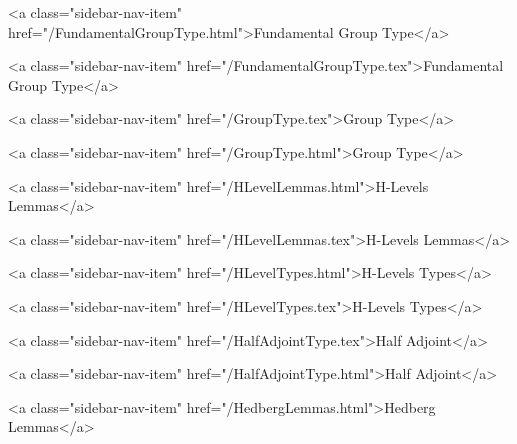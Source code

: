       
        
          <a class="sidebar-nav-item" href="/FundamentalGroupType.html">Fundamental Group Type</a>
        
      
    
      
        
          <a class="sidebar-nav-item" href="/FundamentalGroupType.tex">Fundamental Group Type</a>
        
      
    
      
        
          <a class="sidebar-nav-item" href="/GroupType.tex">Group Type</a>
        
      
    
      
        
          <a class="sidebar-nav-item" href="/GroupType.html">Group Type</a>
        
      
    
      
        
          <a class="sidebar-nav-item" href="/HLevelLemmas.html">H-Levels Lemmas</a>
        
      
    
      
        
          <a class="sidebar-nav-item" href="/HLevelLemmas.tex">H-Levels Lemmas</a>
        
      
    
      
        
          <a class="sidebar-nav-item" href="/HLevelTypes.html">H-Levels Types</a>
        
      
    
      
        
          <a class="sidebar-nav-item" href="/HLevelTypes.tex">H-Levels Types</a>
        
      
    
      
        
          <a class="sidebar-nav-item" href="/HalfAdjointType.tex">Half Adjoint</a>
        
      
    
      
        
          <a class="sidebar-nav-item" href="/HalfAdjointType.html">Half Adjoint</a>
        
      
    
      
        
          <a class="sidebar-nav-item" href="/HedbergLemmas.html">Hedberg Lemmas</a>
        
